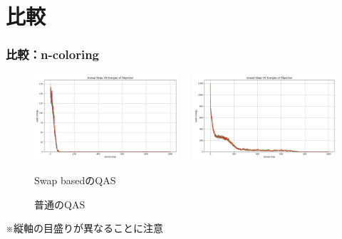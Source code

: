 \section{比較}
\begin{frame}
  \frametitle{比較：n-coloring}
  \begin{figure}
    \begin{columns}
      \begin{column}{0.47\linewidth}
        \includegraphics[width=1\linewidth]{data/GC_ene.png}
        \caption{Swap basedのQAS}        
      \end{column}
      \begin{column}{0.47\linewidth}
        \includegraphics[width=1\linewidth]{data/GC_onehot_ene.png}
        \caption{普通のQAS}
      \end{column}
    \end{columns}
  \end{figure}
  ※縦軸の目盛りが異なることに注意
\end{frame}

